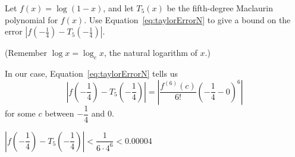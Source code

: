 \begin{Mquestion}
Let $f(x)=\log (1-x)$, and let $T_5(x)$ be the fifth-degree Maclaurin polynomial for $f(x)$. Use Equation~\ref*{eq:taylorErrorN} to give a bound on the error $|f\left(-\frac{1}{4}\right)-T_5\left(-\frac{1}{4}\right)|$.

(Remember $\log x=\log_ex$, the natural logarithm of $x$.)
\end{Mquestion}
\begin{hint}
In our case, Equation~\ref*{eq:taylorErrorN} tells us
\[\left|f\left(-\dfrac{1}{4}\right)-T_5\left(-\dfrac{1}{4}\right)\right| = \left|\dfrac{f^{(6)}(c)}{6!}\left(-\dfrac{1}{4}-0\right)^6\right|\]
for some $c$ between $-\dfrac{1}{4}$ and 0.
\end{hint}
\begin{answer}
$\left|f\left(-\dfrac{1}{4}\right)-T_5\left(-\dfrac{1}{4}\right)\right| < \dfrac{1}{6\cdot 4^6}<0.00004$
\end{answer}
